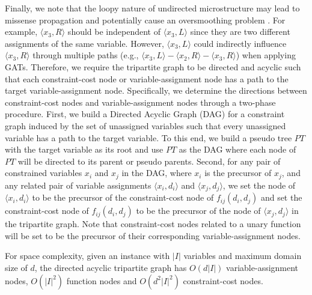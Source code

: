 \documentclass[letterpaper]{article} %
\begin{document}
Finally, we note that the loopy nature of undirected microstructure may lead to missense propagation and potentially cause an oversmoothing problem \cite{li2019deepgcns}. For example, $\langle x_3, R\rangle$ should be independent of $\langle x_3, L\rangle$ since they are two different assignments of the same variable. However, $\langle x_3, L\rangle$ could indirectly influence $\langle x_3, R\rangle$ through multiple paths (e.g., $\langle x_3, L\rangle-\langle x_2, R\rangle-\langle x_3, R\rangle$) when applying GATs. Therefore, we require the tripartite graph to be directed and acyclic such that each constraint-cost node or variable-assignment node has a path to the target variable-assignment node. Specifically, we determine the directions between constraint-cost nodes and variable-assignment nodes through a two-phase procedure. First, we build a Directed Acyclic Graph (DAG) for a constraint graph induced by the set of unassigned variables such that every unassigned variable has a path to the target variable. To this end, we build a pseudo tree $PT$ \cite{freuder1985taking} with the target variable as its root and use $PT$ as the DAG where each node of $PT$ will be directed to its parent or pseudo parents. Second, for any pair of constrained variables $x_i$ and $x_j$ in the DAG, where $x_i$ is the precursor of $x_j$, and any related pair of variable assignments $\langle x_i,d_i\rangle$ and $\langle x_j,d_j\rangle$, we set the node of $\langle x_i,d_i\rangle$ to be the precursor of the constraint-cost node of $f_{ij}(d_i,d_j)$ and set the constraint-cost node of $f_{ij}(d_i,d_j)$ to be the precursor of the node of $\langle x_j,d_j\rangle$ in the tripartite graph.
Note that constraint-cost nodes related to a unary function will be set to be the precursor of their corresponding variable-assignment nodes.

For space complexity, given an instance with $|I|$ variables and maximum domain size of $d$, the directed acyclic tripartite graph has $O(d|I|)$ variable-assignment nodes, $O(|I|^2)$ function nodes and $O(d^2|I|^2)$ constraint-cost nodes.
\end{document}
